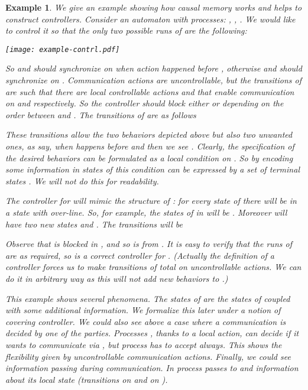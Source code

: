 \documentclass[10pt,a4paper]{article}
\newtheorem{example}[theorem]{Example}
\begin{document}
\begin{example}\label{ex:control}
  We give an example showing how causal memory works and helps to
  construct controllers. Consider an automaton  with  processes:
  , , . We would like to control it so that the only two
  possible runs of  are the following:
  \begin{center}
    \texttt{[image: example-contrl.pdf]}
  \end{center}
 So  and  should synchronize on  when action  happened
 before , otherwise  and  should synchronize on
 . Communication actions are uncontrollable, but the
 transitions of  are such that there are local controllable
 actions  and  that enable communication on  and 
 respectively. So the controller should block either  or 
 depending on the order between  and . The transitions of 
 are as follows
 
 These transitions allow the two behaviors depicted above but also
 two unwanted ones, as say, when  happens before  and then we
 see .  Clearly, the specification of the desired behaviors can be
 formulated as a local 
 condition on . So by encoding some information in states of 
 this condition can be expressed by a set of terminal states . We
 will not do this for readability.

 The controller  for  will mimic the structure of : for
 every state of  there will be in  a state with over-line. So,
 for example, the states of  in  will be . Moreover  will have two new states 
 and . The transitions will be
 
Observe that  is blocked in , and so is  from . It is easy to verify that the runs of  are as
required, so  is a correct controller for . (Actually the definition of a controller forces us to make
 transitions of  total on uncontrollable actions. We can do it in
 arbitrary way as this will not add new behaviors to .)


This example shows several phenomena. The states of  are the
states of  coupled with some additional information. 
We formalize this later under a notion of covering controller.
We could also see above a case where a communication is decided by one
of the parties. Processes , thanks to a local action,
can decide if it wants to communicate via , but process  has
to accept  always. This shows the flexibility given by
uncontrollable communication actions. Finally, we could see
information passing during communication. In  process 
passes to  and  information about its local state (transitions
on  and on ).
\end{example}
\end{document}
